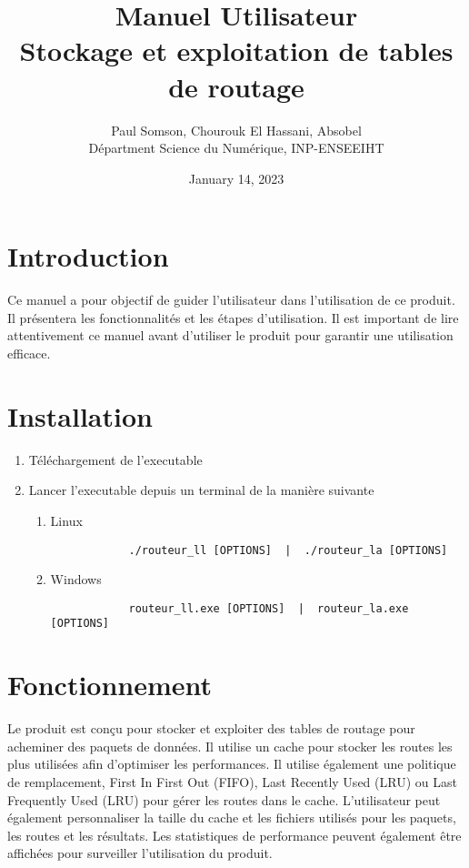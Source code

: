 \documentclass{article}
\title{%
  Manuel Utilisateur \\
  \large Stockage et exploitation de tables de routage}
\author{Paul Somson, Chourouk El Hassani, Absobel \\
    Départment Science du Numérique, INP-ENSEEIHT}
\date{January 14, 2023}
\begin{document}
\maketitle

\tableofcontents

\section{Introduction}
Ce manuel a pour objectif de guider l'utilisateur dans l'utilisation de ce produit. Il présentera les fonctionnalités et les étapes d'utilisation. Il est important de lire attentivement ce manuel avant d'utiliser le produit pour garantir une utilisation efficace.

\section{Installation}
\begin{enumerate}
    \item Téléchargement de l'executable
    \item Lancer l'executable depuis un terminal de la manière suivante
    \begin{enumerate}
        \item Linux
        \begin{verbatim}
            ./routeur_ll [OPTIONS]  |  ./routeur_la [OPTIONS]
        \end{verbatim}
        \item Windows
        \begin{verbatim}
            routeur_ll.exe [OPTIONS]  |  routeur_la.exe [OPTIONS]
        \end{verbatim}
    \end{enumerate}
\end{enumerate}

\section{Fonctionnement}
Le produit est conçu pour stocker et exploiter des tables de routage pour acheminer des paquets de données. Il utilise un cache pour stocker les routes les plus utilisées afin d'optimiser les performances. Il utilise également une politique de remplacement, First In First Out (FIFO), Last Recently Used (LRU) ou Last Frequently Used (LRU) pour gérer les routes dans le cache. L'utilisateur peut également personnaliser la taille du cache et les fichiers utilisés pour les paquets, les routes et les résultats. Les statistiques de performance peuvent également être affichées pour surveiller l'utilisation du produit.
\end{document}
